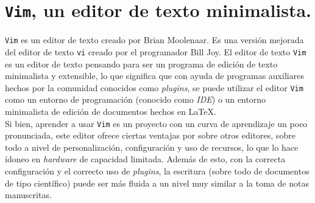 \documentclass[10pt]{article}
\begin{document}
\maketitle

\section{\texttt{Vim}, un editor de texto minimalista.}
\texttt{Vim} es un editor de texto creado por Brian Moolenaar. Es una versión mejorada del editor de texto \texttt{vi} creado por el programador Bill Joy. 
El editor de texto \texttt{Vim} es un editor de texto pensando para ser un programa de edición de texto minimalista y extensible, lo que significa que con ayuda de programas auxiliares hechos por la comunidad conocidos como \textit{plugins}, se puede utilizar el editor \texttt{Vim} como un entorno de programación (conocido como \textit{IDE}) o un entorno minimalista de edición de documentos hechos en \LaTeX. \\ 
Si bien, aprender a usar \texttt{Vim} es un proyecto con un curva de aprendizaje un poco pronunciada, este editor ofrece ciertas ventajas por sobre otros editores, sobre todo a nivel de personalización, configuración y uso de recursos, lo que lo hace ídoneo en \textit{hardware} de capacidad limitada. 
Además de esto, con la correcta configuración y el correcto uso de \textit{plugins}, la escritura (sobre todo de documentos de tipo científico) puede ser más fluida a un nivel muy similar a la toma de notas manuscritas. 
\end{document}
